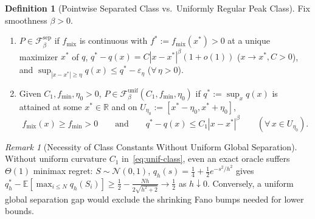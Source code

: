 \documentclass{article}
\theoremstyle{plain}
\theoremstyle{definition}
\newtheorem{definition}{Definition}
\theoremstyle{remark}
\newtheorem{remark}{Remark}
\newcommand{\R}{\mathbb{R}}
\newcommand{\E}{\mathbb{E}}
\newcommand{\fmix}{f_{\mathrm{mix}}}
\begin{document}
\begin{definition}[Pointwise Separated Class vs.\ Uniformly Regular Peak Class]
\label{def:classes}
Fix smoothness $\beta > 0$.
\begin{enumerate}[leftmargin=1.6em,itemsep=1pt,topsep=1pt]
    \item $P \in \mathcal{F}_\beta^{\mathrm{sep}}$ if $\fmix$ is continuous with $f^* := \fmix(x^*) > 0$ at a unique maximizer $x^*$ of $q$, $q^* - q(x) = C|x - x^*|^\beta(1 + o(1))$ ($x \to x^*, C > 0$), and $\sup_{|x-x^*|\ge\eta} q(x) \le q^* - \varepsilon_\eta$ ($\forall\,\eta > 0$).
    \item Given $C_1, f_{\min}, \eta_0 > 0$, $P \in \mathcal{F}_\beta^{\mathrm{unif}}(C_1, f_{\min}, \eta_0)$ if $q^* := \sup_x q(x)$ is attained at some $x^* \in \R$ and on $U_{\eta_0} := [x^* - \eta_0, x^* + \eta_0]$,
    \begin{equation}
    \label{eq:unif-class}
    \fmix(x) \ge f_{\min} > 0 \qquad \text{and} \qquad q^* - q(x) \le C_1 |x - x^*|^\beta \qquad (\forall\, x \in U_{\eta_0}).
    \end{equation}
\end{enumerate}
\end{definition}

\begin{remark}[Necessity of Class Constants Without Uniform Global Separation]
\label{rem:constants}
Without uniform curvature $C_1$ in~\eqref{eq:unif-class}, even an exact oracle suffers $\Theta(1)$ minimax regret: $S \sim \mathcal{N}(0, 1)$, $q_h(s) = \frac{1}{4} + \frac{1}{2}e^{-s^2/h^2}$ gives $q_h^* - \E[\max_{i\le N} q_h(S_i)] \ge \frac{1}{2} - \frac{Nh}{2\sqrt{h^2+2}} \to \frac{1}{2}$ as $h \downarrow 0$. Conversely, a uniform global separation gap would exclude the shrinking Fano bumps needed for lower bounds.
\end{remark}
\end{document}
